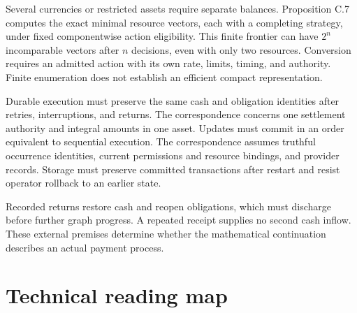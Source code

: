 \documentclass{momentum}
\begin{document}
Several currencies or restricted assets require separate balances. Proposition C.7 computes the exact minimal resource vectors, each with a completing strategy, under fixed componentwise action eligibility. This finite frontier can have $2^n$ incomparable vectors after $n$ decisions, even with only two resources. Conversion requires an admitted action with its own rate, limits, timing, and authority. Finite enumeration does not establish an efficient compact representation.

Durable execution must preserve the same cash and obligation identities after retries, interruptions, and returns. The correspondence concerns one settlement authority and integral amounts in one asset. Updates must commit in an order equivalent to sequential execution. The correspondence assumes truthful occurrence identities, current permissions and resource bindings, and provider records. Storage must preserve committed transactions after restart and resist operator rollback to an earlier state.

Recorded returns restore cash and reopen obligations, which must discharge before further graph progress. A repeated receipt supplies no second cash inflow. These external premises determine whether the mathematical continuation describes an actual payment process.

\section{Technical reading map}
\end{document}
